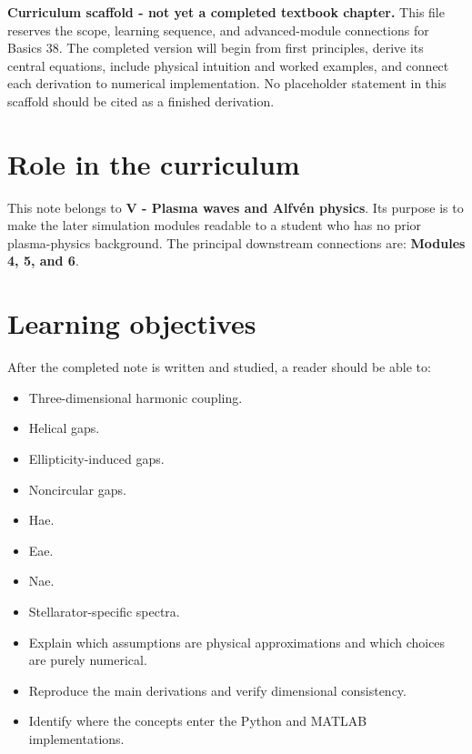 \documentclass[11pt]{article}
\begin{document}

\begin{overviewbox}
\textbf{Curriculum scaffold - not yet a completed textbook chapter.} This file reserves the scope, learning sequence, and advanced-module connections for Basics 38. The completed version will begin from first principles, derive its central equations, include physical intuition and worked examples, and connect each derivation to numerical implementation. No placeholder statement in this scaffold should be cited as a finished derivation.
\end{overviewbox}

\ProjectTOC

\section{Role in the curriculum}
This note belongs to \textbf{V - Plasma waves and Alfv\'en physics}. Its purpose is to make the later simulation modules readable to a student who has no prior plasma-physics background. The principal downstream connections are: \textbf{Modules 4, 5, and 6}.

\section{Learning objectives}
After the completed note is written and studied, a reader should be able to:
\begin{itemize}[leftmargin=1.6em]
\item Three-dimensional harmonic coupling.
\item Helical gaps.
\item Ellipticity-induced gaps.
\item Noncircular gaps.
\item Hae.
\item Eae.
\item Nae.
\item Stellarator-specific spectra.
\item Explain which assumptions are physical approximations and which choices are purely numerical.
\item Reproduce the main derivations and verify dimensional consistency.
\item Identify where the concepts enter the Python and MATLAB implementations.
\end{itemize}
\end{document}
